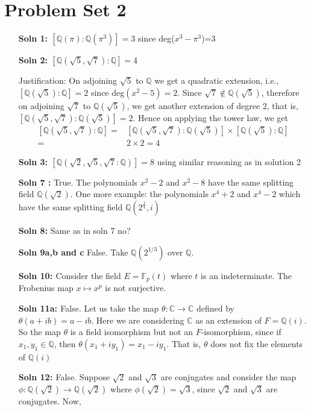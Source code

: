 \documentclass[12pt]{article}
\begin{document}
\section{Problem Set 2}
\begin{enumerate}
    \item[\bf{Soln 1: }] $[\mathbb{Q}(\pi):\mathbb{Q}(\pi^3)]=3$ since deg($x^3-\pi^3$)=3 
    \item[\bf{Soln 2: }]  $[\mathbb{Q}(\sqrt5,\sqrt7):\mathbb{Q}]=4$ 

    
    Justification:  On adjoining $\sqrt5$ to $\mathbb{Q}$ we get a quadratic extension, i.e., $[\mathbb{Q}(\sqrt5):\mathbb{Q}]=2$ since deg$(x^2-5)=2$. Since $\sqrt7 \notin \mathbb{Q}(\sqrt5)$, therefore on adjoining $\sqrt7$ to $\mathbb{Q}(\sqrt5)$, we get another extension of degree 2, that is, $[\mathbb{Q}(\sqrt5,\sqrt7):\mathbb{Q}(\sqrt5)]=2$. Hence on applying the tower law, we get
    \[
        \begin{aligned}
            [\mathbb{Q}(\sqrt5,\sqrt7):\mathbb{Q}]=&[\mathbb{Q}(\sqrt5,\sqrt7):\mathbb{Q}(\sqrt5)] \times [\mathbb{Q}(\sqrt5):\mathbb{Q}]\\
            =&2 \times 2=4
        \end{aligned}
    \]
    \item[\bf{Soln 3: }] $[\mathbb{Q}(\sqrt2,\sqrt5,\sqrt7:\mathbb{Q})]=8$ using similar reasoning as in solution 2
    \item[\bf{Soln 7 :} ]  True. The polynomials $x^2-2$ and $x^2 -8$ have the same splitting field $\mathbb{Q}(\sqrt2)$. One more example: the polynomials $x^4+2$ and $x^4-2$ which have the same splitting field $\mathbb{Q}(2^\frac{1}{4},i)$
    \item[\bf{Soln 8}: ] Same as in soln 7 no?
    \item[\bf{Soln 9a,b and c}] False. Take $\mathbb{Q}(2^{1/3})$ over $\mathbb{Q}$. 
    \item[\bf{Soln 10: }] Consider the field $E=\mathbb{F}_p(t)$ where $t$ is an indeterminate. The Frobenius map $x \longmapsto x^p$ is not surjective.
    \item[\bf{Soln 11a: }] False. Let us take the map $\theta : \mathbb{C \longrightarrow C}$ defined by $\theta(a+ib)=a-ib.$ Here we are considering $\mathbb{C}$ as an extension of $F=\mathbb{Q}(i)$. So the map $\theta$ is a field isomorphism but not an $F$-isomorphism, since if $x_1,y_1\in \mathbb{Q}$, then $\theta(x_1+iy_1)=x_1-iy_1$. That is, $\theta$ does not fix the elements of $\mathbb{Q}(i)$
    \item[\bf{Soln 12: }] False. Suppose $\sqrt2$ and $\sqrt3$ are conjugates and consider the map $\phi: \mathbb{Q}(\sqrt2) \longrightarrow\mathbb{Q}(\sqrt2)$ where $\phi(\sqrt2)=\sqrt3$, since $\sqrt2$ and $\sqrt3$ are conjugates. Now,

\end{enumerate}
\end{document}
